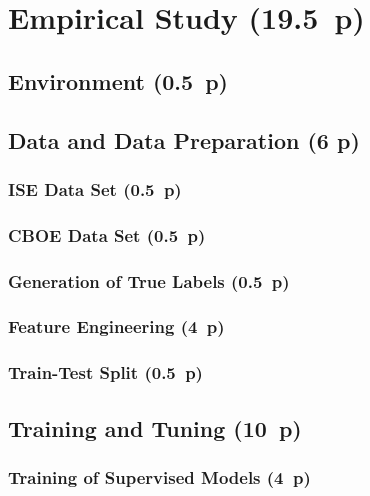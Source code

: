 \newpage
\section{Empirical Study (19.5~p)}\label{empirical-study}

\subsection{Environment (0.5~p)}\label{environment}

\subsection{Data and Data Preparation (6 p)}\label{data-and-data-preparation}

\subsubsection{ISE Data Set (0.5~p)}\label{ise-data-set}

\subsubsection{CBOE Data Set (0.5~p)}\label{cboe-data-set}

\subsubsection{Generation of True
  Labels (0.5~p)}\label{generation-of-true-labels}

\subsubsection{Feature Engineering (4~p)}\label{feature-engineering}

\subsubsection{Train-Test Split (0.5~p)}\label{train-test-split}

\subsection{Training and Tuning (10~p)}\label{training-and-tuning}

\subsubsection{Training of Supervised
  Models (4~p)}\label{training-of-supervised-models}


